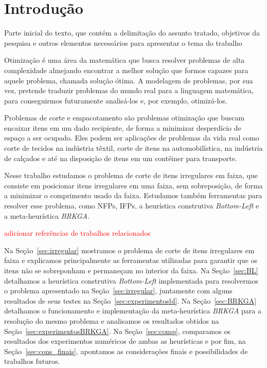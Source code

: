 
\chapter[Introdução]{Introdução}
\label{Introdução}


Parte inicial do texto, que contém a delimitação do assunto tratado, objetivos da pesquisa e outros elementos necessários para apresentar o tema do trabalho 




Otimização é uma área da matemática que busca resolver problemas de alta complexidade almejando encontrar a melhor solução que formos capazes para aquele problema, chamada solução ótima. 
A modelagem de problemas, por sua vez, pretende traduzir problemas do mundo real para a linguagem matemática, para conseguirmos futuramente analisá-los e, por exemplo, otimizá-los.

Problemas de corte e empacotamento são problemas otimização que buscam encaixar itens em um dado recipiente, de forma a minimizar desperdício de espaço a ser ocupado. 
Eles podem ser aplicações de problemas da vida real como corte de tecidos na indústria têxtil, corte de itens na automobilística, na indústria de calçados e até na disposição de itens em um contêiner para transporte. 

Nesse trabalho estudamos o problema de corte de itens irregulares em faixa, que consiste em posicionar itens irregulares em uma faixa, sem sobreposição, de forma a minimizar o comprimento usado da faixa. 
Estudamos também ferramentas para resolver esse problema, como NFPs, IFPs, a heurística construtiva \textit{Bottom-Left} e a meta-heurística \textit{BRKGA}.

\textcolor{red}{adicionar referências de trabalhos relacionados}

Na Seção~\ref{sec:irregular} mostramos o problema de corte de itens irregulares em faixa e explicamos principalmente as ferramentas utilizadas para garantir que os itens não se sobreponham e permaneçam no interior da faixa. 
Na Seção~\ref{sec:BL} detalhamos a heurística construtiva \textit{Bottom-Left} implementada para resolvermos o problema apresentado na Seção~\ref{sec:irregular}, juntamente com alguns resultados de seus testes na Seção~\ref{sec:experimentosbl}. 
Na Seção~\ref{sec:BRKGA} detalhamos o funcionamento e implementação da meta-heurística \textit{BRKGA} para a resolução do mesmo problema e analisamos os resultados obtidos na Seção~\ref{sec:experimentosBRKGA}. 
Na Seção~\ref{sec:comp}, comparamos os resultados dos experimentos numéricos de ambas as heurísticas e por fim, na Seção~\ref{sec:cons_finais}, apontamos as considerações finais e possibilidades de trabalhos futuros.